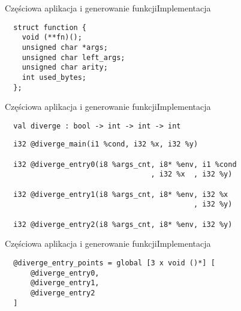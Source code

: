 \documentclass{beamer}
\begin{document}
\begin{frame}[fragile]{Częściowa aplikacja i generowanie funkcji}{Implementacja}
\begin{center}
\begin{minipage}{1.0\textwidth}
\begin{verbatim}    
  struct function {
    void (**fn)();
    unsigned char *args;
    unsigned char left_args;
    unsigned char arity;
    int used_bytes;   
  };
\end{verbatim}
\end{minipage}
\end{center}
\end{frame}

\begin{frame}[fragile]{Częściowa aplikacja i generowanie funkcji}{Implementacja}
\begin{center}
\begin{minipage}{1.0\textwidth}
\begin{verbatim}    
  val diverge : bool -> int -> int -> int
\end{verbatim}
\pagebreak
\pagebreak
\begin{verbatim} 
  i32 @diverge_main(i1 %cond, i32 %x, i32 %y)

  i32 @diverge_entry0(i8 %args_cnt, i8* %env, i1 %cond 
                                  , i32 %x  , i32 %y)

  i32 @diverge_entry1(i8 %args_cnt, i8* %env, i32 %x
                                            , i32 %y)

  i32 @diverge_entry2(i8 %args_cnt, i8* %env, i32 %y)
\end{verbatim}
\end{minipage}
\end{center}
\end{frame}

\begin{frame}[fragile]{Częściowa aplikacja i generowanie funkcji}{Implementacja}
\begin{center}
\begin{minipage}{1.0\textwidth}
\begin{verbatim} 
  @diverge_entry_points = global [3 x void ()*] [
      @diverge_entry0,
      @diverge_entry1,
      @diverge_entry2
  ]
\end{verbatim}
\end{minipage}
\end{center}
\end{frame}
\end{document}
